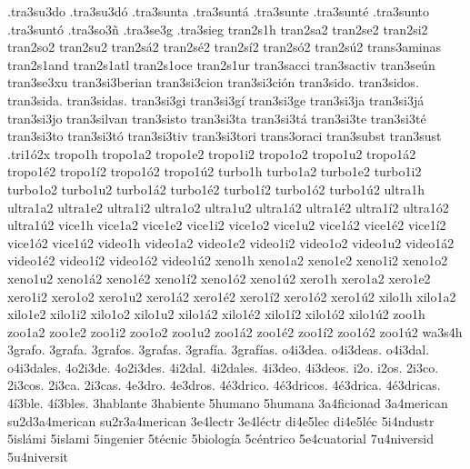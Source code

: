 {.tra3su3do
.tra3su3dó
.tra3sunta
.tra3suntá
.tra3sunte
.tra3sunté
.tra3sunto
.tra3suntó
.tra3so3ñ
.tra3se3g
.tra3sieg
tran2s1h
tran2sa2 tran2se2 tran2si2 tran2so2 tran2su2
tran2sá2 tran2sé2 tran2sí2 tran2só2 tran2sú2
trans3aminas
tran2s1and
tran2s1atl
tran2s1oce
tran2s1ur
tran3sacci
tran3sactiv
tran3seún
tran3se3xu
tran3si3berian
tran3si3cion
tran3si3ción
tran3sido.
tran3sidos.
tran3sida.
tran3sidas.
tran3si3gi
tran3si3gí
tran3si3ge
tran3si3ja
tran3si3já
tran3si3jo
tran3silvan
tran3sisto
tran3si3ta
tran3si3tá
tran3si3te
tran3si3té
tran3si3to
tran3si3tó
tran3si3tiv
tran3si3tori
trans3oraci
tran3subst
tran3sust
.tri1ó2x
tropo1h
tropo1a2 tropo1e2 tropo1i2 tropo1o2 tropo1u2
tropo1á2 tropo1é2 tropo1í2 tropo1ó2 tropo1ú2
turbo1h
turbo1a2 turbo1e2 turbo1i2 turbo1o2 turbo1u2
turbo1á2 turbo1é2 turbo1í2 turbo1ó2 turbo1ú2
ultra1h
ultra1a2 ultra1e2 ultra1i2 ultra1o2 ultra1u2
ultra1á2 ultra1é2 ultra1í2 ultra1ó2 ultra1ú2
vice1h
vice1a2 vice1e2 vice1i2 vice1o2 vice1u2
vice1á2 vice1é2 vice1í2 vice1ó2 vice1ú2
video1h
video1a2 video1e2 video1i2 video1o2 video1u2
video1á2 video1é2 video1í2 video1ó2 video1ú2
xeno1h
xeno1a2 xeno1e2 xeno1i2 xeno1o2 xeno1u2
xeno1á2 xeno1é2 xeno1í2 xeno1ó2 xeno1ú2
xero1h
xero1a2 xero1e2 xero1i2 xero1o2 xero1u2
xero1á2 xero1é2 xero1í2 xero1ó2 xero1ú2
xilo1h
xilo1a2 xilo1e2 xilo1i2 xilo1o2 xilo1u2
xilo1á2 xilo1é2 xilo1í2 xilo1ó2 xilo1ú2
zoo1h
zoo1a2 zoo1e2 zoo1i2 zoo1o2 zoo1u2
zoo1á2 zoo1é2 zoo1í2 zoo1ó2 zoo1ú2
wa3s4h
3grafo.
3grafa.
3grafos.
3grafas.
3grafía.
3grafías.
o4i3dea.
o4i3deas.
o4i3dal.
o4i3dales.
4o2i3de.
4o2i3des.
4i2dal.
4i2dales.
4i3deo.
4i3deos.
i2o.
i2os.
2i3co.
2i3cos.
2i3ca.
2i3cas.
4e3dro.
4e3dros.
4é3drico.
4é3dricos.
4é3drica.
4é3dricas.
4í3ble.
4í3bles.
3hablante
3habiente
5humano
5humana
3a4ficionad
3a4merican
su2d3a4merican
su2r3a4merican
3e4lectr
3e4léctr
di4e5lec
di4e5léc
5i4ndustr
5islámi
5islami
5ingenier
5técnic
5biología
5céntrico
5e4cuatorial
7u4niversid
5u4niversit
}